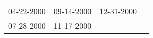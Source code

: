 \begin{supertabular}{llll}
 04-22-2000 &  09-14-2000 &  12-31-2000 \\
 07-28-2000 &  11-17-2000 &             \\
\end{supertabular}

